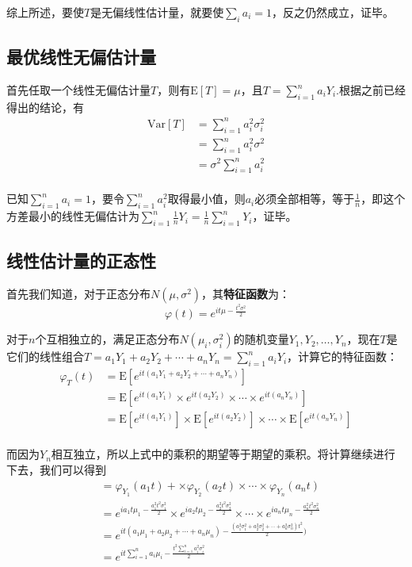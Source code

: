 \documentclass[UTF8]{ctexbook}
\begin{document}
综上所述，要使$T$是无偏线性估计量，就要使$\sum_{i}a_i=1$，反之仍然成立，证毕。
\subsection{最优线性无偏估计量}
\label{proof4}
首先任取一个线性无偏估计量$T$，则有$\mathrm{E}[T]=\mu$，且$T=\sum_{i=1}^na_iY_i$.根据之前已经得出的结论，有
\begin{align*}
	\mathrm{Var}[T]&=\sum_{i=1}^na_i^2\sigma_i^2\\
	&=\sum_{i=1}^na_i^2\sigma^2\\
	&=\sigma^2\sum_{i=1}^na_i^2\\
\end{align*}

已知$\sum_{i=1}^na_i=1$，要令$\sum_{i=1}^na_i^2$取得最小值，则$a_i$必须全部相等，等于$\frac{1}{n}$，即这个方差最小的线性无偏估计为$\sum_{i=1}^n\frac{1}{n}Y_i=\frac{1}{n}\sum_{i=1}^nY_i$，证毕。

\subsection{线性估计量的正态性}
\label{proof5}
首先我们知道，对于正态分布$N(\mu, \sigma^2)$，其\textbf{特征函数}为：
\[
	\varphi(t)=e^{it\mu-\frac{t^2\sigma^2}{2}}
\]

对于$n$个互相独立的，满足正态分布$N(\mu_i,\sigma_i^2)$的随机变量$Y_1,Y_2,\dots,Y_n$，现在$T$是它们的线性组合$T=a_1Y_1+a_2Y_2+\cdots+a_nY_n=\sum_{i=1}^na_iY_i$，计算它的特征函数：
\[
	\begin{aligned}
	\varphi_T(t)&=\mathrm E[e^{it(a_1Y_1+a_2Y_2+\cdots+a_nY_n)}]\\
	&=\mathrm E[e^{it(a_1Y_1)}\times e^{it(a_2Y_2)}\times \cdots \times e^{it(a_nY_n)}]\\
	&=\mathrm E[e^{it(a_1Y_1)}]\times \mathrm E[e^{it(a_2Y_2)}] \times \cdots \times \mathrm E[e^{it(a_nY_n)}]\\
	\end{aligned}
\]

而因为$Y_n$相互独立，所以上式中的乘积的期望等于期望的乘积。将计算继续进行下去，我们可以得到
\begin{align*}
	&=\varphi_{Y_1}(a_1t)+\times\varphi_{Y_2}(a_2t)\times\cdots\times\varphi_{Y_n}(a_nt)\\
	&=e^{ia_1t\mu_1-\frac{a_1^2t^2\sigma_1^2}{2}}\times e^{ia_2t\mu_2-\frac{a_2^2t^2\sigma_2^2}{2}}\times\cdots\times e^{ia_nt\mu_n-\frac{a_n^2t^2\sigma_n^2}{2}}\\
	&=e^{it(a_1\mu_1+a_2\mu_2+\cdots+a_n\mu_n)-\frac{(a_1^2\sigma_1^2+a_2^2\sigma_2^2+\cdots+a_n^2\sigma_n^2)t^2}{2})}\\
	&=e^{it\sum_{i=1}^na_i\mu_i-\frac{t^2\sum_{i=1}^na_i^2\sigma_i^2}{2}}
\end{align*}
\end{document}
